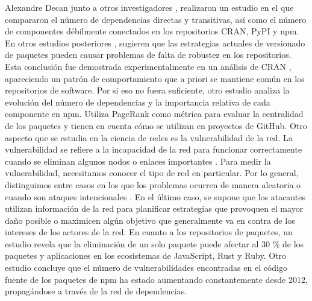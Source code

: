 Alexandre Decan junto a otros investigadores \cite{10.1145/2993412.3003382}, realizaron un estudio en el que compararon el número de dependencias
directas y transitivas, así como el número de componentes débilmente conectados en los repositorios CRAN, PyPI y npm.
En otros estudios posteriores \cite{10.1109/SANER.2017.7884604}, sugieren que las estrategias actuales de versionado de paquetes
pueden causar problemas de falta de robustez en los repositorios. Esta conclusión fue demostrada experimentalmente en un análisis de
CRAN \cite{10.1109/SANER.2016.12}, apareciendo un patrón de comportamiento que a priori se mantiene común en los repositorios de software.
Por si eso no fuera suficiente, otro estudio \cite{10.1145/2901739.2901743} analiza la evolución del número de dependencias y la importancia
relativa de cada componente en npm. Utiliza PageRank como métrica para evaluar la centralidad de los paquetes y tienen en cuenta cómo
se utilizan en proyectos de GitHub.
Otro aspecto que se estudia en la ciencia de redes es la vulnerabilidad de la red. La vulnerabilidad se refiere a la incapacidad de la
red para funcionar correctamente cuando se eliminan algunos nodos o enlaces importantes \cite{posfai2016network}. Para medir la vulnerabilidad,
necesitamos conocer el tipo de red en particular. Por lo general, distinguimos entre casos en los que los problemas ocurren de manera aleatoria
o cuando son ataques intencionales \cite{Albert2000}. En el último caso, se supone que los atacantes utilizan información de la red para
planificar estrategias que provoquen el mayor daño posible o maximicen algún objetivo que generalmente va en contra de los intereses de los
actores de la red.
En cuanto a los repositorios de paquetes, un estudio \cite{10.1145/2901739.2901743} revela que la eliminación de un solo paquete puede
afectar al 30 \% de los paquetes y aplicaciones en los ecosistemas de JavaScript, Rust y Ruby.
Otro estudio \cite{10.1145/3196398.3196401} concluye que el número de vulnerabilidades encontradas en el código fuente de los paquetes
de npm ha estado aumentando constantemente desde 2012, propagándose a través de la red de dependencias.



